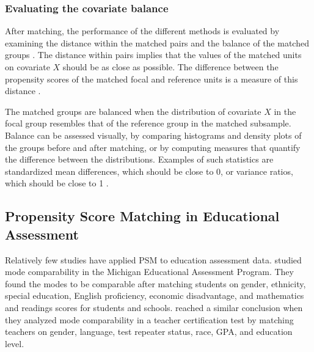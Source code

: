 \documentclass{article}
\begin{document}

\subsubsection{Evaluating the covariate balance} \label{sec:balance}

After matching, the performance of the different methods is evaluated by examining the distance within the matched pairs and the balance of the matched groups \citep{gu1993comparison}. The distance within pairs implies that the values of the matched units on covariate $X$ should be as close as possible. The difference between the propensity scores of the matched focal and reference units is a measure of this distance \citep{stuart2010matching}. 

The matched groups are balanced when the distribution of covariate $X$ in the focal group resembles that of the reference group in the matched subsample. Balance can be assessed visually, by comparing histograms and density plots of the groups before and after matching, or by computing measures that quantify the difference between the distributions. Examples of such statistics are standardized mean differences, which should be close to 0, or variance ratios, which should be close to 1 \citep{chen2020propensity}. 

\subsection{Propensity Score Matching in Educational Assessment}

Relatively few studies have applied PSM to education assessment data. \citet{seo2015comparability} studied mode comparability in the Michigan Educational Assessment Program. They found the modes to be comparable after matching students on gender, ethnicity, special education, English proficiency, economic disadvantage, and mathematics and readings scores for students and schools. \citet{puhan2005evaluating} reached a similar conclusion when they analyzed mode comparability in a teacher certification test by matching teachers on gender, language, test repeater status, race, GPA, and education level.
\end{document}

